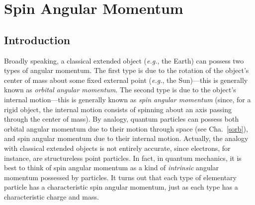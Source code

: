 \chapter{Spin Angular Momentum}\label{sspin}
\section{Introduction}
Broadly speaking, a classical extended object ({\em e.g.}, the Earth) can possess two types of
angular momentum. The first type is due to the rotation of the
object's center of mass about some  fixed external point ({\em e.g.}, the Sun)---this
is generally known as {\em orbital angular momentum}. The
second type is due to the object's internal motion---this is generally
known as {\em spin angular momentum} (since, for a rigid object, the internal
motion consists of spinning about an axis passing through the center of
mass). By analogy,  quantum  particles can possess
both orbital angular momentum due to their motion through space
 (see
Cha.~\ref{sorb}),
and spin angular momentum due to their internal motion. 
Actually, the analogy with classical extended objects is not entirely accurate, since electrons, for instance,
are structureless point particles. In fact, in quantum mechanics, it is best to think of spin angular momentum
 as  a kind of {\em intrinsic}\/ angular momentum possessed by particles. It turns out that each type of elementary particle
has a characteristic spin angular momentum, just as each type
has a characteristic charge and  mass.


